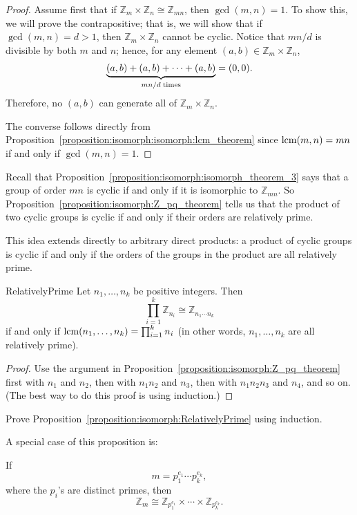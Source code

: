 \begin{proof}
Assume first that if ${\mathbb Z}_m \times {\mathbb Z}_n \cong {\mathbb
Z}_{mn}$, then $\gcd(m, n) = 1$. To show this, we will prove the
contrapositive; that is, we will show that if $\gcd(m, n) = d >
1$, then ${\mathbb Z}_m \times {\mathbb Z}_n$ cannot be cyclic. Notice that
$mn/d$ is divisible by both $m$ and $n$; hence, for any element $(a,b)
\in {\mathbb Z}_m \times {\mathbb Z}_n$,  
\[
\underbrace{(a,b) + (a,b)+ \cdots + (a,b)}_{mn/d \; {\rm
times}}
= (0, 0).
\]
Therefore, no $(a, b)$ can generate all of ${\mathbb Z}_m \times {\mathbb
Z}_n$. 

 
The converse follows directly from Proposition~\ref{proposition:isomorph:isomorph:lcm_theorem} since
$\operatorname{lcm}(m,n) = mn$ if and only if $\gcd(m,n)=1$. 
\end{proof}

Recall that Proposition~\ref{proposition:isomorph:isomorph_theorem_3} says that a group of order $mn$ is cyclic if and only if  it is isomorphic to ${\mathbb Z_{mn}}$.  So Proposition~\ref{proposition:isomorph:Z_pq_theorem} tells us that the product of two cyclic groups is cyclic if and only if their orders are relatively prime.
\medskip 

This idea extends directly to arbitrary direct products: a product of cyclic groups is cyclic if and only if the 
orders of the groups in the product are all relatively prime.

\begin{prop}{RelativelyPrime}
Let $n_1, \ldots, n_k$ be positive integers. Then
\[
\prod_{i=1}^k {\mathbb Z}_{n_i} \cong {\mathbb Z}_{n_1 \cdots n_k}
\]
if and only if $\operatorname{lcm}( n_1, \ldots, n_k) =\prod_{i=1}^k n_i$ (in other words, $n_1, \ldots, n_k$ are all relatively prime).
\end{prop}

\begin{proof}
Use the argument in Proposition~\ref{proposition:isomorph:Z_pq_theorem} first with $n_1$ and $n_2$, then with $n_1n_2$ and $n_3$,
then with $n_1n_2n_3$ and $n_4$, and so on. (The best way to do this proof is using induction.)
\end{proof}

\begin{exercise}{}
Prove Proposition~\ref{proposition:isomorph:RelativelyPrime} using induction.
\end{exercise}

A special case of this proposition is:
 
\begin{corollary}
If
\[
m = p_1^{e_1} \cdots  p_k^{e_k},
\]
where the $p_i$'s are distinct primes, then
\[
{\mathbb Z}_m \cong {\mathbb Z}_{p_1^{e_1}} \times \cdots \times {\mathbb
Z}_{p_k^{e_k}}.
\]
\end{corollary}
 
